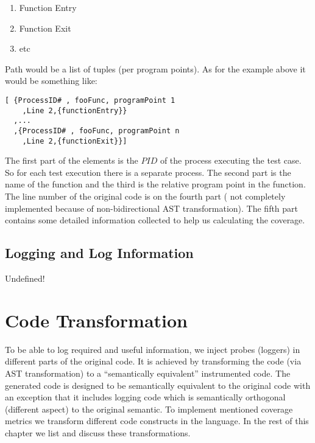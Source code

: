 \documentclass[12pt,a4paper]{report}
\begin{document}
\begin{enumerate}
 \item Function Entry
 \item Function Exit
 \item etc
\end{enumerate}
 
Path would be a list of tuples (per program points). As for the example above it would be something like:

\begin{lstlisting}
[ {ProcessID# , fooFunc, programPoint 1
    ,Line 2,{functionEntry}}
  ,...
  ,{ProcessID# , fooFunc, programPoint n
    ,Line 2,{functionExit}}]
\end{lstlisting}

The first part of the elements is the $PID$ of the process executing the test case. So for each test execution there is a separate process. The second part is the name of the
 function and the third is the relative program point in the function. The line number of the original code is on the fourth part ( not completely implemented because of
 non-bidirectional AST transformation). The fifth part contains some detailed information collected to help us calculating the coverage.   

\subsection{Logging and Log Information}
Undefined!

\section{Code Transformation}
To be able to log required and useful information, we inject probes (loggers) in different parts of the original code. It is achieved by transforming the code (via AST
 transformation) to a “semantically equivalent” instrumented code. The generated code is designed to be semantically equivalent to the original code with an exception that it
 includes logging code which is semantically orthogonal (different aspect) to the original semantic. To implement mentioned coverage metrics we transform different code
 constructs in the language. In the rest of this chapter we list and discuss these transformations.
\end{document}
